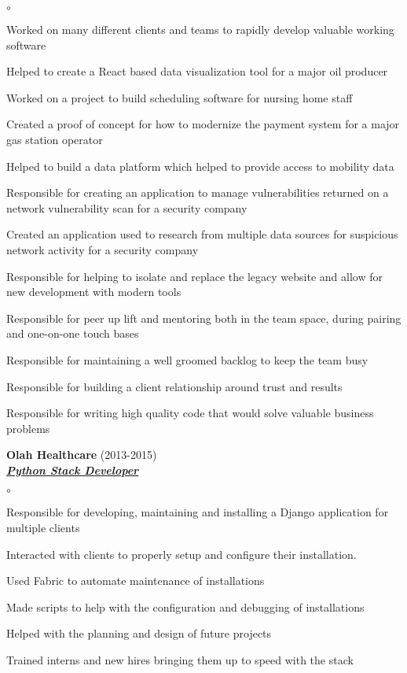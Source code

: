 \documentclass{article}
\newcommand{\employer}[3]{{ \textbf{#1} (#2)\\ \underline{\textbf{\emph{#3}}}\\  }}
\newenvironment{achievements}{\begin{list}{$\circ$}{\topsep 0pt \itemsep -2pt}}{\vspace*{4pt}\end{list}}
\begin{document}
	\begin{achievements}
	\item Worked on many different clients and teams to rapidly develop valuable working software
	\item Helped to create a React based data visualization tool for a major oil producer
	\item Worked on a project to build scheduling software for nursing home staff
	\item Created a proof of concept for how to modernize the payment system for a major gas station operator
	\item Helped to build a data platform which helped to provide access to mobility data
	\item Responsible for creating an application to manage vulnerabilities returned on a network vulnerability scan for a security company
	\item Created an application used to research from multiple data sources for suspicious network activity for a security company
	\item Responsible for helping to isolate and replace the legacy website and allow for new development with modern tools
	\item Responsible for peer up lift and mentoring both in the team space, during pairing and one-on-one touch bases
	\item Responsible for maintaining a well groomed backlog to keep the team busy
	\item Responsible for building a client relationship around trust and results
	\item Responsible for writing high quality code that would solve valuable business problems
	\end{achievements}

\employer{Olah Healthcare}{2013-2015}{Python Stack Developer}
	\begin{achievements}
	\item Responsible for developing, maintaining and installing a Django application for multiple clients
	\item Interacted with clients to properly setup and configure their installation.
	\item Used Fabric to automate maintenance of installations
	\item Made scripts to help with the configuration and debugging of
	installations
	\item Helped with the planning and design of future projects
	\item Trained interns and new hires bringing them up to speed with
	the stack
	\end{achievements}
\end{document}
